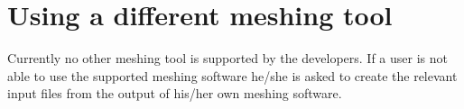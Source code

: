     \section{Using a different meshing tool}
	\label{sec:diffmesh}
		Currently no other meshing tool is supported by the developers. If a user is not able to use the supported meshing software he/she is asked to create the relevant input files from the output of his/her own meshing software.     	  
    	